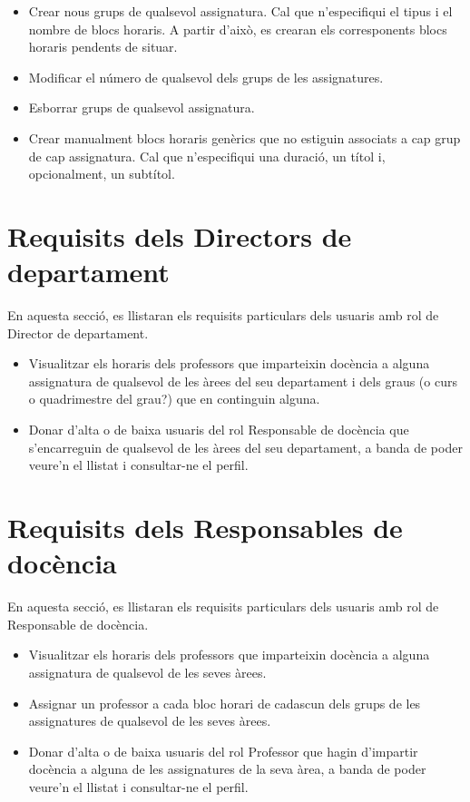 \documentclass[a4paper,12pt]{ThesisStyle}
\begin{document}
\begin{itemize}
\begin{itemize}
      \item Crear nous grups de qualsevol assignatura. Cal que n'especifiqui el tipus i el nombre de blocs horaris. A partir d'això, es crearan els corresponents blocs horaris pendents de situar.
      \item Modificar el número de qualsevol dels grups de les assignatures.
      \item Esborrar grups de qualsevol assignatura.
      \item Crear manualment blocs horaris genèrics que no estiguin associats a cap grup de cap assignatura. Cal que n'especifiqui una duració, un títol i, opcionalment, un subtítol.
    \end{itemize}
\end{itemize}

\section{Requisits dels Directors de departament} %
\label{sec:requisits_director_departament}

En aquesta secció, es llistaran els requisits particulars dels usuaris amb rol de Director de departament.

\begin{itemize}
  \item Visualitzar els horaris dels professors que imparteixin docència a alguna assignatura de qualsevol de les àrees del seu departament i dels graus (o curs o quadrimestre del grau?) que en continguin alguna.
  \item Donar d'alta o de baixa usuaris del rol Responsable de docència que s'encarreguin de qualsevol de les àrees del seu departament, a banda de poder veure'n el llistat i consultar-ne el perfil.
\end{itemize}

\section{Requisits dels Responsables de docència} %
\label{sec:requisits_responsables_docencia}

En aquesta secció, es llistaran els requisits particulars dels usuaris amb rol de Responsable de docència.

\begin{itemize} %
  \item Visualitzar els horaris dels professors que imparteixin docència a alguna assignatura de qualsevol de les seves àrees.
  \item Assignar un professor a cada bloc horari de cadascun dels grups de les assignatures de qualsevol de les seves àrees.
  \item Donar d'alta o de baixa usuaris del rol Professor que hagin d'impartir docència a alguna de les assignatures de la seva àrea, a banda de poder veure'n el llistat i consultar-ne el perfil.
\end{itemize}
\end{document}
